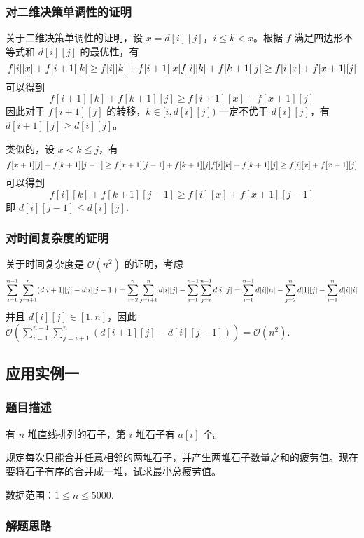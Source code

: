 \documentclass[a4paper, UTF8]{ctexart}
\begin{document}
\subsubsection{对二维决策单调性的证明}

关于二维决策单调性的证明，设 \(x=d[i][j]\)，\(i\le k < x\)。根据 \(f\)
满足四边形不等式和 \(d[i][j]\) 的最优性，有 \[
f[i][x]+f[i+1][k]\ge f[i][k]+f[i+1][x]\\
f[i][k]+f[k+1][j]\ge f[i][x]+f[x+1][j]
\] 可以得到 \[
f[i+1][k]+f[k+1][j]\ge f[i+1][x]+f[x+1][j]
\] 因此对于 \(f[i+1][j]\) 的转移，\(k\in [i,d[i][j])\) 一定不优于
\(d[i][j]\)，有 \(d[i+1][j]\ge d[i][j]\)。

类似的，设 \(x < k\le j\)，有 \[
f[x+1][j]+f[k+1][j-1]\ge f[x+1][j-1]+f[k+1][j]\\
f[i][k]+f[k+1][j]\ge f[i][x]+f[x+1][j]
\] 可以得到 \[
f[i][k]+f[k+1][j-1]\ge f[i][x]+f[x+1][j-1]
\] 即 \(d[i][j-1]\le d[i][j]\).

\subsubsection{对时间复杂度的证明}

关于时间复杂度是 \(\mathcal{O}(n^2)\) 的证明，考虑 \[
\sum_{i=1}^{n-1}\sum_{j=i+1}^n(d[i+1][j]-d[i][j-1])\\
=\sum_{i=2}^n\sum_{j=i+1}^nd[i][j]-\sum_{i=1}^{n-1}\sum_{j=i}^{n-1}d[i][j]\\
=\sum_{i=1}^{n-1}d[i][n]-\sum_{j=2}^nd[1][j]-\sum_{i=1}^nd[i][i]
\] 并且 \(d[i][j]\in[1,n]\)，因此
\(\mathcal{O}(\sum_{i=1}^{n-1}\sum_{j=i+1}^n(d[i+1][j]-d[i][j-1]))=\mathcal{O}(n^2)\).

\subsection{应用实例一}

\subsubsection{题目描述}

有 \(n\) 堆直线排列的石子，第 \(i\) 堆石子有 \(a[i]\) 个。

规定每次只能合并任意相邻的两堆石子，并产生两堆石子数量之和的疲劳值。现在要将石子有序的合并成一堆，试求最小总疲劳值。

数据范围：\(1\le n\le 5000\).

\subsubsection{解题思路}
\end{document}
